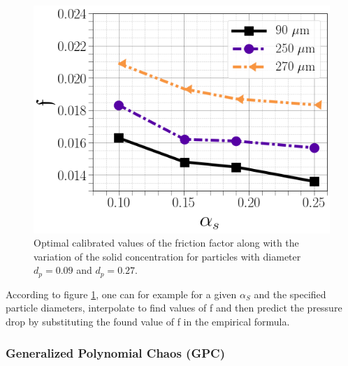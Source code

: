 \documentclass[11pt]{report}
\begin{document}
\begin{minipage}[t]{0.35\textwidth}
\begin{minipage}[t]{0.5\textwidth}
\begin{minipage}[t]{0.35\textwidth}
\begin{minipage}[t]{0.35\textwidth}
\begin{figure}[ht!]
\begin{center}
 \includegraphics[scale = 0.35]{figs/suur.png}
 \caption{Optimal calibrated values of the friction factor along with the variation of the solid concentration for particles with diameter $d_p=0.09$ and $d_p=0.27$.}
 \label{surro}
 \end{center}
 \end{figure}
 According to figure \ref{surro}, one can for example for a given $\alpha_S$ and the specified particle diameters, interpolate to find values of f and then predict the pressure drop by substituting the found value of f in the empirical formula.
 \subsubsection{Generalized Polynomial Chaos (GPC)}





\end{minipage}
\end{minipage}
\end{minipage}
\end{minipage}
\end{document}
